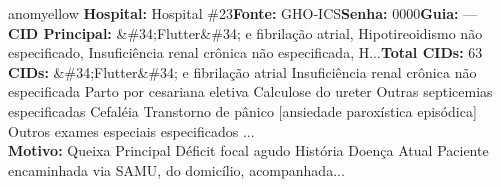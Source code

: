 \documentclass[a4paper,10pt]{article}
\begin{document}
\begin{anomalycard}[Interna\c{c}\~{a}o \#508 | Pac. \#583 | MODERADO (z=2.08) | LOS: 11d | 12/03/2026\,$\to$\,—]{anomyellow}
\textbf{Hospital:} Hospital \#23\quad \textbf{Fonte:} GHO-ICS\quad \textbf{Senha:} 0000\quad \textbf{Guia:} ---\\

\textbf{CID Principal:} {\small \&\#34;Flutter\&\#34; e fibrilação atrial, Hipotireoidismo não especificado, Insuficiência renal crônica não especificada, H...}\quad\textbf{Total CIDs:} 63\\

\textbf{CIDs:} {\scriptsize \&\#34;Flutter\&\#34; e fibrilação atrial \textbar{} Insuficiência renal crônica não especificada \textbar{} Parto por cesariana eletiva \textbar{} Calculose do ureter \textbar{} Outras septicemias especificadas \textbar{} Cefaléia \textbar{} Transtorno de pânico [ansiedade paroxística episódica] \textbar{} Outros exames especiais especificados ...}\\

\textbf{Motivo:} {\scriptsize Queixa Principal    Déficit focal agudo    História Doença Atual    Paciente encaminhada via SAMU, do domicílio, acompanhada...}\\

\end{anomalycard}
\end{document}
